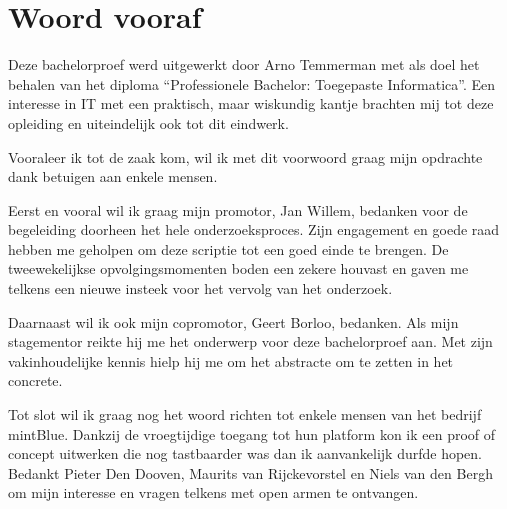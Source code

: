 
\chapter*{Woord vooraf}
\label{ch:voorwoord}

Deze bachelorproef werd uitgewerkt door Arno Temmerman met als doel het behalen van het diploma ``Professionele Bachelor: Toegepaste Informatica''. Een interesse in IT met een praktisch, maar wiskundig kantje brachten mij tot deze opleiding en uiteindelijk ook tot dit eindwerk.

Vooraleer ik tot de zaak kom, wil ik met dit voorwoord graag mijn opdrachte dank betuigen aan enkele mensen.

Eerst en vooral wil ik graag mijn promotor, Jan Willem, bedanken voor de begeleiding doorheen het hele onderzoeksproces. Zijn engagement en goede raad hebben me geholpen om deze scriptie tot een goed einde te brengen. De tweewekelijkse opvolgingsmomenten boden een zekere houvast en gaven me telkens een nieuwe insteek voor het vervolg van het onderzoek.

Daarnaast wil ik ook mijn copromotor, Geert Borloo, bedanken. Als mijn stagementor reikte hij me het onderwerp voor deze bachelorproef aan. Met zijn vakinhoudelijke kennis hielp hij me om het abstracte om te zetten in het concrete.

Tot slot wil ik graag nog het woord richten tot enkele mensen van het bedrijf mintBlue. Dankzij de vroegtijdige toegang tot hun platform kon ik een proof of concept uitwerken die nog tastbaarder was dan ik aanvankelijk durfde hopen. Bedankt Pieter Den Dooven, \mbox{Maurits} van Rijckevorstel en Niels van den Bergh om mijn interesse en vragen telkens met open armen te ontvangen.